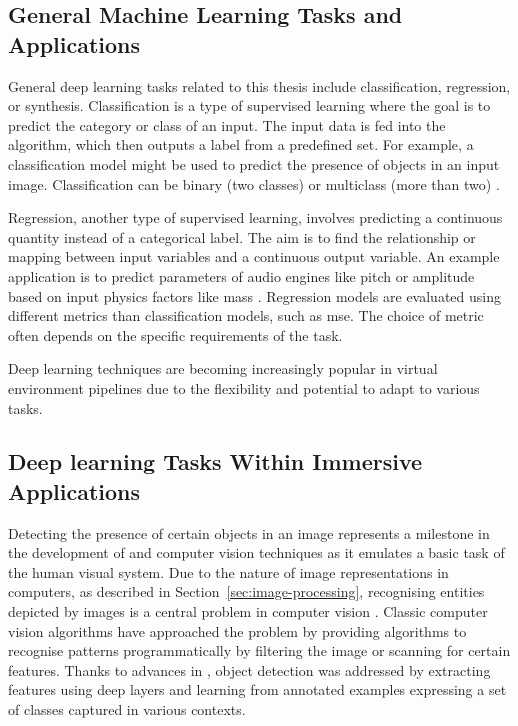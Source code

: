 \subsection{General Machine Learning Tasks and Applications}
General deep learning tasks related to this thesis include classification, regression, or synthesis.
Classification is a type of supervised learning where the goal is to predict the category or class of an input. The input data is fed into the algorithm, which then outputs a label from a predefined set. For example, a classification model might be used to predict the presence of objects in an input image. Classification can be binary (two classes) or multiclass (more than two) \citep{goodfellow2016deep}.\par
Regression, another type of supervised learning, involves predicting a continuous quantity instead of a categorical label. The aim is to find the relationship or mapping between input variables and a continuous output variable. An example application is to predict parameters of audio engines like pitch or amplitude based on input physics factors like mass \citep{colombo2021psychometric}. Regression models are evaluated using different metrics than classification models, such as \acrfull{mse}. The choice of metric often depends on the specific requirements of the task.\par
Deep learning techniques are becoming increasingly popular in virtual environment pipelines due to the flexibility and potential to adapt to various tasks.

\subsection{Deep learning Tasks Within Immersive Applications}
Detecting the presence of certain objects in an image represents a milestone in the development of  and computer vision techniques as it emulates a basic task of the human visual system. Due to the nature of image representations in computers, as described in Section~\ref{sec:image-processing}, recognising entities depicted by images is a central problem in computer vision \citep{szeliski2022computer}. Classic computer vision algorithms have approached the problem by providing algorithms to recognise patterns programmatically by filtering the image or scanning for certain features. Thanks to advances in , object detection was addressed by extracting features using deep layers and learning from annotated examples expressing a set of classes captured in various contexts.\par
